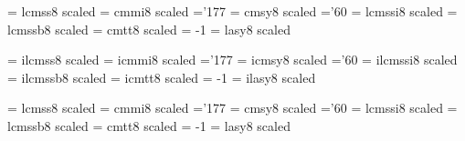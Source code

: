 
% 
\def\newfont#1#2{\@ifdefinable #1{\font #1=#2\relax}}
\def\symbol#1{\char #1\relax}


\font\fourteenrm   = lcmss8  scaled  %
\font\fourteeni    = cmmi8   scaled  %
    \skewchar\fourteeni ='177                  %
\font\fourteensy   = cmsy8   scaled  %
    \skewchar\fourteensy ='60           %
\font\fourteenit   = lcmssi8 scaled  %
\font\fourteenbf   = lcmssb8 scaled  %
\font\fourteentt   = cmtt8   scaled  %
    \hyphenchar\fourteentt = -1         %
\font\fourteenlasy = lasy8  scaled  %

\font\ifourteenrm   = ilcmss8  scaled  %
\font\ifourteeni    = icmmi8   scaled  %
    \skewchar\ifourteeni ='177                  %
\font\ifourteensy   = icmsy8   scaled  %
    \skewchar\ifourteensy ='60           %
\font\ifourteenit   = ilcmssi8 scaled  %
\font\ifourteenbf   = ilcmssb8 scaled  %
\font\ifourteentt   = icmtt8   scaled  %
    \hyphenchar\ifourteentt = -1         %
\font\ifourteenlasy = ilasy8  scaled  %

\font\seventeenrm   = lcmss8  scaled  %
\font\seventeeni    = cmmi8   scaled  %
    \skewchar\seventeeni ='177                  %
\font\seventeensy   = cmsy8   scaled  %
    \skewchar\seventeensy ='60           %
\font\seventeenit   = lcmssi8 scaled  %
\font\seventeenbf   = lcmssb8 scaled  %
\font\seventeentt   = cmtt8   scaled  %
    \hyphenchar\seventeentt = -1         %
\font\seventeenlasy = lasy8  scaled  %

